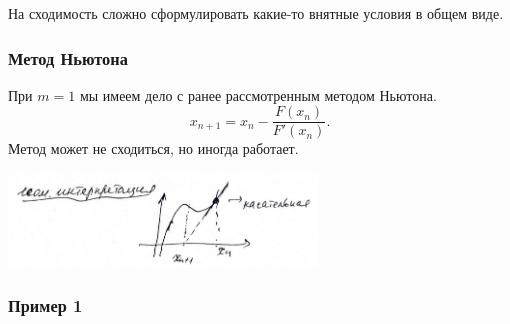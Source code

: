 На сходимость сложно сформулировать какие-то внятные условия в общем виде.

\subsubsection{Метод Ньютона}
При $m=1$ мы имеем дело с ранее рассмотренным методом Ньютона. 
\[
	x_{n+1} = x_n - \frac{F(x_n)}{F'(x_n)}.
\]
Метод может не сходиться, но иногда работает.
\begin{center}
	\includegraphics[width=8.2cm]{../figures/lection_1/figure_2.png}
\end{center}

\subsubsection{Пример 1}